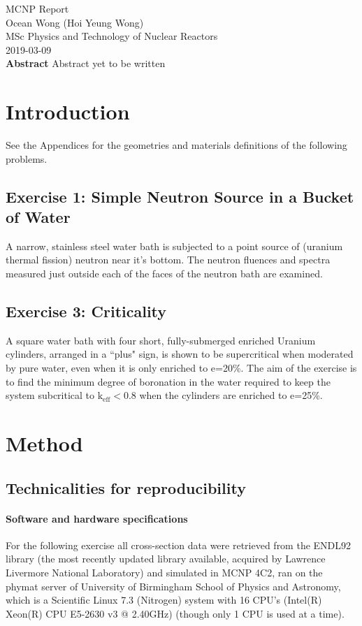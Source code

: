 \documentclass[a4paper, 12pt]{article}
\begin{document}
\begin{center}
MCNP Report										\\
Ocean Wong (Hoi Yeung Wong)						\\
MSc Physics and Technology of Nuclear Reactors	\\
2019-03-09 										\\
\textbf{Abstract}
Abstract yet to be written
\end{center}

\section{Introduction}
See the Appendices for the geometries and materials definitions of the following problems.
\subsection{Exercise 1: Simple Neutron Source in a Bucket of Water}
A narrow, stainless steel water bath is subjected to a point source of (uranium thermal fission) neutron near it's bottom. The neutron fluences and spectra measured just outside each of the faces of the neutron bath are examined. 
\subsection{Exercise 3: Criticality}
A square water bath with four short, fully-submerged enriched Uranium cylinders, arranged in a ``plus" sign, is shown to be supercritical when moderated by pure water, even when it is only enriched to e=20\%. The aim of the exercise is to find the minimum degree of boronation in the water required to keep the system subcritical to $\text{k}_{\text{eff}}<0.8$ when the cylinders are enriched to e=25\%.

\section{Method}
\subsection{Technicalities for reproducibility}
\paragraph{Software and hardware specifications\indent} For the following exercise all cross-section data were retrieved from the ENDL92 library (the most recently updated library available, acquired by Lawrence Livermore National Laboratory) and simulated in MCNP 4C2, ran on the phymat server of University of Birmingham School of Physics and Astronomy, which is a Scientific Linux 7.3 (Nitrogen) system with 16 CPU's (Intel(R) Xeon(R) CPU E5-2630 v3 @ 2.40GHz) (though only 1 CPU is used at a time).
\end{document}

